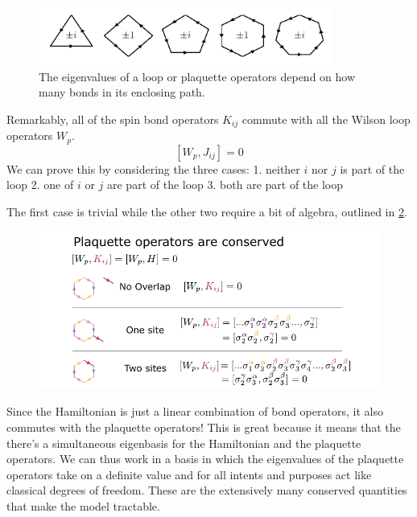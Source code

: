 \begin{figure}
\hypertarget{fig:regular_plaquettes}{%
\centering
\includegraphics[width=0.86\textwidth,height=\textheight]{figure_code/amk_chapter/regular_plaquettes/regular_plaquettes.pdf}
\caption{The eigenvalues of a loop or plaquette operators depend on how many bonds in its enclosing path.}\label{fig:regular_plaquettes}
}
\end{figure}

Remarkably, all of the spin bond operators \(K_{ij}\) commute with all the Wilson loop operators \(W_p\). \[[W_p, J_{ij}] = 0\] We can prove this by considering the three cases: 1. neither \(i\) nor \(j\) is part of the loop 2. one of \(i\) or \(j\) are part of the loop 3. both are part of the loop

The first case is trivial while the other two require a bit of algebra, outlined in \cref{fig:visual_kitaev_2}.

\begin{figure}
\hypertarget{fig:visual_kitaev_2}{%
\centering
\includegraphics[width=1.43\textwidth,height=\textheight]{figure_code/amk_chapter/visual_kitaev_2.pdf}
\caption{}\label{fig:visual_kitaev_2}
}
\end{figure}

Since the Hamiltonian is just a linear combination of bond operators, it also commutes with the plaquette operators! This is great because it means that the there's a simultaneous eigenbasis for the Hamiltonian and the plaquette operators. We can thus work in a basis in which the eigenvalues of the plaquette operators take on a definite value and for all intents and purposes act like classical degrees of freedom. These are the extensively many conserved quantities that make the model tractable.

